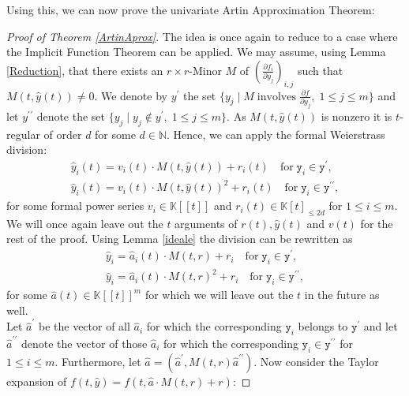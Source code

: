\documentclass[10pt, a4paper]{article}
\def\wh{\widehat}
\theoremstyle{remark}
\theoremstyle{remark}
\begin{document}
\noindent Using this, we can now prove the univariate Artin Approximation Theorem:
\begin{proof}[Proof of Theorem \ref{ArtinAprox}]
    The idea is once again to reduce to a case where the Implicit Function Theorem can be applied. We may assume, using Lemma \ref{Reduction}, that there exists an $r\times r$-Minor $M$ of $\left(\frac{\partial f_i}{\partial y_j}\right)_{i,j}$ such that $M(t,\wh{y}(t))\neq0$. We denote by $y^\prime$ the set $\{y_j\mid M\; \mathrm{involves}\;\frac{\partial f}{\partial y_j},\;1\leq j\leq m\}$ and let $y^{\prime\prime}$ denote the set $\{y_j\mid y_j\not\in y^\prime,\;1\leq j\leq m\}.$ As $M(t,\wh{y}(t))$ is nonzero it is $t$-regular of order $d$ for some $d\in\mathbb{N}$. Hence, we can apply the formal Weierstrass division:
   \begin{equation}\begin{gathered}
\wh{y}_i(t) = v_i(t)\cdot M(t,\wh{y}(t)) + r_i(t) \quad \mathrm{for} \;\mathtt{y}_i\in \mathtt{y}^\prime,\\
\wh{y}_i(t) = v_i(t)\cdot M(t,\wh{y}(t))^2 + r_i(t) \quad \mathrm{for} \;\mathtt{y}_i\in \mathtt{y}^{\prime\prime},
\end{gathered}\end{equation}
for some formal power series $v_i\in\mathbb{K}[[t]]$ and $r_i(t)\in\mathbb{K}[t]_{\leq2d}$ for $1\leq i\leq m$. We will once again leave out the $t$ arguments of $r(t),\wh{y}(t)$ and $v(t)$ for the rest of the proof. Using Lemma \ref{ideale} the division can be rewritten as 
\begin{equation}
\begin{gathered}
    \wh{y}_i = \wh{a}_i(t)\cdot M(t,r) + r_i \quad \mathrm{for} \;\mathtt{y}_i\in \mathtt{y}^\prime,\\
\wh{y}_i = \wh{a}_i(t)\cdot M(t,r)^2 + r_i \quad \mathrm{for} \;\mathtt{y}_i\in \mathtt{y}^{\prime\prime},
\end{gathered}
\end{equation}
for some $\wh{a}(t)\in\mathbb{K}[[t]]^m$ for which we will leave out the $t$ in the future as well.
\\Let $\wh{a}^\prime$ be the vector of all $\wh{a}_i$ for which the corresponding $\mathtt{y}_i$ belongs to $ \mathtt{y}^\prime$ and let $\wh{a}^{\prime\prime}$ denote the vector of those $\wh{a}_i$ for which the corresponding $\mathtt{y}_i\in \mathtt{y}^{\prime\prime}$ for $1\leq i\leq m$. Furthermore, let $\wh{a}=(\wh{a}^\prime,M(t,r)\wh{a}^{\prime\prime})$. Now consider the Taylor expansion of $f(t,\wh{y})=f(t,\wh{a}\cdot M(t,r)+r)$:

\end{proof}
\end{document}
